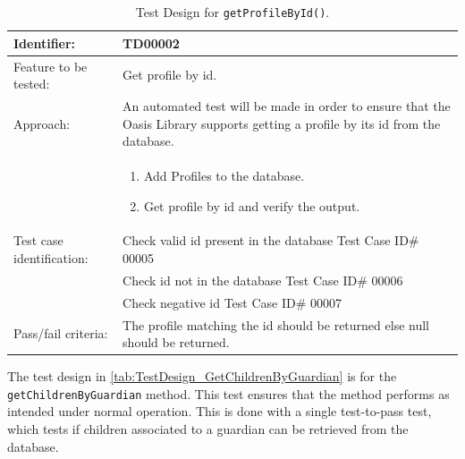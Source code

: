 \begin{table}[htbp]
	\centering
		\begin{tabular}{| p{4.5cm} | m{9cm} |}
			\hline
			Identifier: 				& TD00002 \\ \hline
			Feature to be tested:		& Get profile by id. \\ \hline
			Approach:					& An automated test will be made in order to ensure that the Oasis Library supports getting a profile by its id from the database. \\
										&	\begin{enumerate}
												\item Add Profiles to the database.
												\item Get profile by id and verify the output.
											\end{enumerate} \\ \hline
			Test case identification: 	& Check valid id present in the database Test Case ID\# 00005 \\
										& Check id not in the database Test Case ID\# 00006 \\
										& Check negative id Test Case ID\# 00007 \\ \hline
			Pass/fail criteria:			& The profile matching the id should be returned else null should be returned. \\ \hline
		\end{tabular}
	\caption{Test Design for \texttt{getProfileById()}.}
	\label{tab:TestDesign_GetProfileById}
\end{table}

The test design in \autoref{tab:TestDesign_GetChildrenByGuardian} is for the \texttt{getChildrenByGuardian} method.
This test ensures that the method performs as intended under normal operation.
This is done with a single test-to-pass test, which tests if children associated to a guardian can be retrieved from the database.

